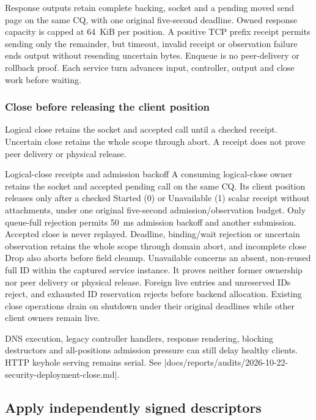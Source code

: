Response outputs retain complete backing, socket and a pending moved send page
on the same CQ, with one original five-second deadline. Owned response capacity
is capped at 64~KiB per position. A positive TCP prefix receipt permits sending
only the remainder, but timeout, invalid receipt or observation failure ends output
without resending uncertain bytes. Enqueue is no peer-delivery or rollback proof.
Each service turn advances input, controller, output and close work before waiting.

\subsubsection{Close before releasing the client position}

Logical close retains the socket and accepted call until a checked receipt.
Uncertain close retains the whole scope through abort. A receipt does not prove
peer delivery or physical release.

\begin{implementationdetail}{Logical-close receipts and admission backoff}
A consuming logical-close owner retains the socket and accepted pending call on
the same CQ. Its client position releases only after a checked Started (0) or
Unavailable (1) scalar receipt without attachments, under one original five-second admission/observation budget.
Only queue-full rejection permits 50~ms admission backoff and another submission.
Accepted close is never replayed. Deadline, binding/wait rejection or uncertain
observation retains the whole scope through domain abort, and incomplete close Drop
also aborts before field cleanup. Unavailable concerns an absent, non-reused
full ID within the captured service instance. It proves neither former
ownership nor peer delivery or physical release. Foreign live entries and
unreserved IDs reject, and exhausted ID reservation rejects before backend allocation.
Existing close operations drain on shutdown under their original deadlines while
other client owners remain live.
\end{implementationdetail}

DNS execution, legacy controller handlers, response rendering, blocking
destructors and all-positions admission pressure can still delay healthy clients. HTTP keyhole
serving remains serial. See
\repofile|docs/reports/audits/2026-10-22-security-deployment-close.md|.

\subsection{Apply independently signed descriptors}


